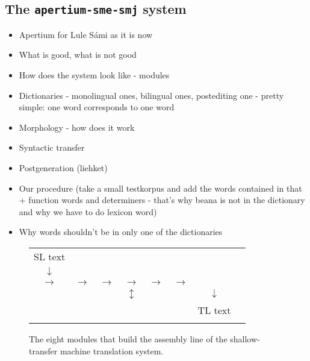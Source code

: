\documentclass[a4paper,english,12pt]{article}
\begin{document}
\subsection{The {\tt apertium-sme-smj} system}

\begin{itemize}
\item Apertium for Lule Sámi as it is now
\item What is good, what is not good
\item How does the system look like - modules
\item Dictionaries - monolingual ones, bilingual ones, postediting one - pretty simple: one word corresponds to one word
\item Morphology - how does it work
\item Syntactic transfer
\item Postgeneration (liehket)
\item Our procedure (take a small testkorpus and add the words contained in that + function words and determiners - that's why beana is not in the dictionary and why we have to do lexicon word)
\item Why words shouldn't be in only one of the dictionaries
\end{itemize}

\begin{figure*} {\footnotesize \setlength{\tabcolsep}{0.5mm}
\begin{center}
\begin{tabular}{cccccccc} 
\\
\parbox{0.7cm}{SL text} \\ 
$\downarrow$ \\
 $\rightarrow$ &
  $\rightarrow$ &
 $\rightarrow$ &
 $\rightarrow$ &
  $\rightarrow$ &
 $\rightarrow$ &
 \\ & & & $\updownarrow$ & &
& $\downarrow$ \\ & & &  & &
& \parbox{0.7cm}{TL text}\\\\
\end{tabular}
\end{center} }
\caption{The eight modules that build the assembly line of the
shallow-transfer machine translation system.}
\label{fg:modules}
\label{pg:modules}
\end{figure*}
\end{document}
